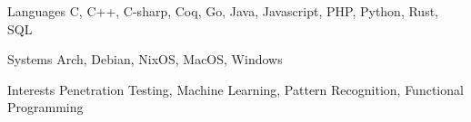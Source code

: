 
\begin{cvskills}
  \cvskill
    {Languages}
    {C, C++, C-sharp, Coq, Go, Java, Javascript, PHP, Python, Rust, SQL}

  \cvskill
    {Systems}
    {Arch, Debian, NixOS, MacOS, Windows}

  \cvskill
    {Interests}
    {Penetration Testing, Machine Learning, Pattern Recognition, Functional Programming}
\end{cvskills}
